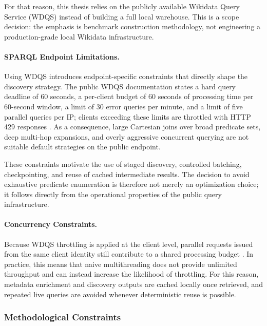 \documentclass[12pt,a4paper]{article}
\begin{document}
For that reason, this thesis relies on the publicly available Wikidata Query Service (WDQS) instead of building a full local warehouse. This is a scope decision: the emphasis is benchmark construction methodology, not engineering a production-grade local Wikidata infrastructure.

\paragraph{SPARQL Endpoint Limitations.}

Using WDQS introduces endpoint-specific constraints that directly shape the discovery strategy. The public WDQS documentation states a hard query deadline of 60 seconds, a per-client budget of 60 seconds of processing time per 60-second window, a limit of 30 error queries per minute, and a limit of five parallel queries per IP; clients exceeding these limits are throttled with HTTP 429 responses \cite{wikidata_query_service_manual}. As a consequence, large Cartesian joins over broad predicate sets, deep multi-hop expansions, and overly aggressive concurrent querying are not suitable default strategies on the public endpoint.

These constraints motivate the use of staged discovery, controlled batching, checkpointing, and reuse of cached intermediate results. The decision to avoid exhaustive predicate enumeration is therefore not merely an optimization choice; it follows directly from the operational properties of the public query infrastructure.

\paragraph{Concurrency Constraints.}

Because WDQS throttling is applied at the client level, parallel requests issued from the same client identity still contribute to a shared processing budget \cite{wikidata_query_service_manual}. In practice, this means that naive multithreading does not provide unlimited throughput and can instead increase the likelihood of throttling. For this reason, metadata enrichment and discovery outputs are cached locally once retrieved, and repeated live queries are avoided whenever deterministic reuse is possible.

\subsubsection{Methodological Constraints}
\end{document}
